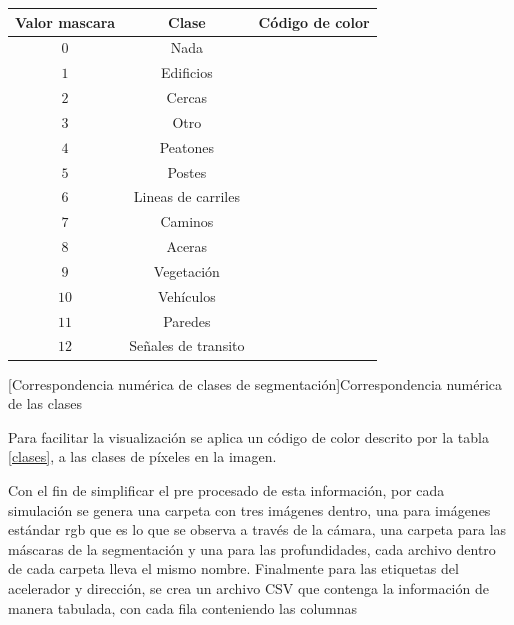 \begin{center}
	\footnotesize
	\begin{tabular}{|c|c|c|}
		\hline
		Valor mascara & Clase & Código de color\\
		\hline
		$0$ & Nada & \cellcolor{none}\\
		\hline
		$1$ & Edificios & \cellcolor{buildings}\\
		\hline
		$2$ & Cercas & \cellcolor{fences}\\
		\hline
		$3$ & Otro & \cellcolor{other}\\
		\hline
		$4$ & Peatones & \cellcolor{pedestrians}\\
		\hline
		$5$ & Postes & \cellcolor{poles}\\
		\hline
		$6$ & Lineas de carriles & \cellcolor{roadlines}\\
		\hline
		$7$ & Caminos & \cellcolor{roads}\\
		\hline
		$8$ & Aceras & \cellcolor{sidewalks}\\
		\hline
		$9$ & Vegetación & \cellcolor{vegetation}\\
		\hline
		$10$ & Vehículos & \cellcolor{vehicles}\\
		\hline
		$11$ & Paredes & \cellcolor{walls}\\
		\hline
		$12$ & Señales de transito & \cellcolor{trafficsigns}\\
		\hline
	\end{tabular}
	[Correspondencia numérica de clases de segmentación]{Correspondencia numérica de las clases}\label{clases}
\end{center}

Para facilitar la visualización se aplica un código de color descrito por la tabla \ref{clases}, a las clases de píxeles en la imagen.


Con el fin de simplificar el pre procesado de esta información, por cada simulación se genera una carpeta con tres imágenes dentro, una para imágenes estándar rgb que es lo que se observa a través de la cámara, una carpeta para las máscaras de la segmentación y una para las profundidades, cada archivo dentro de cada carpeta lleva el mismo nombre. Finalmente para las etiquetas del acelerador y dirección, se crea un archivo CSV que contenga la información de manera tabulada, con cada fila conteniendo las columnas

